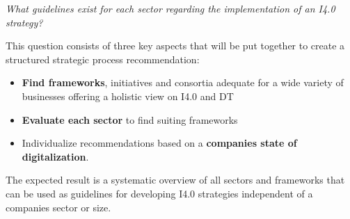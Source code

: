 \emph{What guidelines exist for each sector regarding the implementation of an \acf{I4.0} strategy?}


This question consists of three key aspects that will be put together to create a structured strategic process recommendation:
\begin{itemize}
    \item \textbf{Find frameworks}, initiatives and consortia adequate for a wide variety of businesses offering a holistic view on \ac{I4.0} and \ac{DT}
    \item \textbf{Evaluate each sector} to find suiting frameworks
    \item Individualize recommendations based on a \textbf{companies state of digitalization}.
\end{itemize}

The expected result is a systematic overview of all sectors and frameworks that can be used as guidelines for developing \ac{I4.0} strategies independent of a companies sector or size. 



